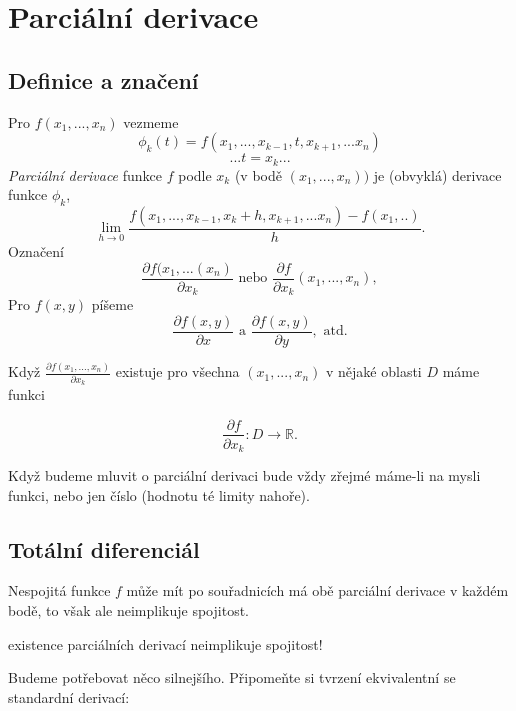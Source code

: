\documentclass[../main.tex]{subfiles}
\begin{document}
\section{Parciální derivace}

\subsection{Definice a značení}
\hspace{1.2mm}
Pro $f(x_1,...,x_n)$ vezmeme 
\[\phi_k(t) = f(x_1,...,x_{k-1},t,x_{k+1},...x_n)\]
\[... t = x_k...\]
\hspace{1.2mm}
\textit{Parciální derivace} funkce $f$ podle $x_k$ (v bodě $(x_1,...,x_n))$ je (obvyklá) derivace funkce $\phi_k$,
\[\lim_{h\rightarrow 0}\frac{f(x_1,...,x_{k-1},x_k+h,x_{k+1},...x_n) - f(x_1,..)}{h}.\]
\hspace{1.2mm}
Označení
\[\frac{\partial f(x_1,...(x_n)}{\partial x_k} \textrm{ nebo } \frac{\partial f}{\partial x_k} (x_1,...,x_n),\]
\hspace{1.2mm}
Pro $f(x,y)$ píšeme
\[\frac{\partial f(x,y)}{\partial x} \textrm{ a } \frac{\partial f(x,y)}{\partial y}, \textrm{ atd.}\]

\noindent
\hspace{1.2mm}
Když $\frac{\partial f(x_1,...,x_n)}{\partial x_k}$ existuje pro všechna $(x_1,...,x_n)$ v nějaké oblasti $D$ máme funkci

\[\frac{\partial f}{\partial x_k}: D \rightarrow \mathbb{R}.\]

\noindent
\hspace{1.2mm}
Když budeme mluvit o parciální derivaci bude vždy zřejmé máme-li na mysli funkci, nebo jen číslo (hodnotu té limity nahoře).
\noindent

\subsection{Totální diferenciál}
\hspace{1.2mm}
Nespojitá funkce $f$ může mít po souřadnicích má obě parciální derivace v každém bodě, to však ale neimplikuje spojitost.
\begin{center}
    existence parciálních derivací neimplikuje spojitost!
\end{center}
\hspace{1.2mm}
Budeme potřebovat něco silnejšího. Připomeňte si tvrzení ekvivalentní se standardní derivací:
\end{document}
